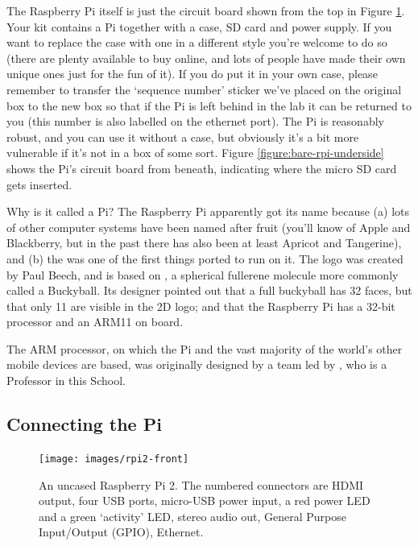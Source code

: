 The Raspberry Pi itself is just the circuit board shown from the top in Figure \ref{figure:bare-rpi}. Your kit contains a Pi together with a case, SD card and power supply. If you want to replace the case with one in a different style you're welcome to do so (there are plenty available to buy online, and lots of people have made their own unique ones just for the fun of it). If you do put it in your own case, please remember to transfer the `sequence number' sticker we've placed on the original box to the new box so that if the Pi is left behind in the lab it can be returned to you (this number is also labelled on the ethernet port). The Pi is reasonably robust, and you can use it without a case, but obviously it's a bit more vulnerable if it's not in a box of some sort. Figure \ref{figure:bare-rpi-underside} shows the Pi's circuit board from beneath, indicating where the micro SD card gets inserted.

\begin{rpi}{Why is it called a Pi?}
  The Raspberry Pi apparently got its name because (a) lots of other computer systems have been named after fruit (you'll know of Apple and Blackberry, but in the past there has also been at least Apricot and Tangerine), and (b) the  was one of the first things ported to run on it. The logo was created by Paul Beech, and is based on , a spherical fullerene molecule more commonly called a Buckyball. Its designer pointed out that a full buckyball has 32 faces, but that only 11 are visible in the 2D logo; and that the Raspberry Pi has a 32-bit processor and an ARM11 on board.

The ARM processor, on which the Pi and the vast majority of the world's other mobile devices are based, was originally designed by a team led by , who is a Professor in this School.
\end{rpi}

\subsection{Connecting the Pi}
\label{sec:connecting-pi}


\begin{figure}
\centerline{\texttt{[image: images/rpi2-front]}}
\caption{An uncased Raspberry Pi 2. The numbered connectors are \protect{} HDMI output,  \protect{} four USB ports,  \protect{} micro-USB power input,  \protect{} a red power LED and a green `activity' LED,  \protect{} stereo audio out,  \protect{} General Purpose Input/Output (GPIO),  \protect{} Ethernet.}\label{figure:bare-rpi}
\end{figure}

